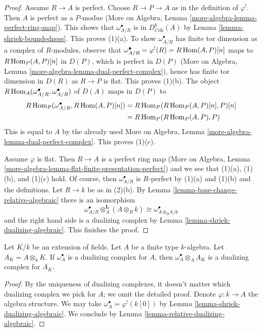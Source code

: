 \begin{proof}
Assume $R \to A$ is perfect. Choose $R \to P \to A$ as in the definition
of $\varphi^!$. Then $A$ is perfect as a $P$-modue
(More on Algebra, Lemma \ref{more-algebra-lemma-perfect-ring-map}).
This shows that $\omega_{A/R}^\bullet$ is in $D^b_{\textit{Coh}}(A)$
by Lemma \ref{lemma-shriek-boundedness}. This proves (1)(a).
To show $\omega_{A/R}^\bullet$ has finite tor dimension
as a complex of $R$-modules, observe that
$\omega_{A/R}^\bullet = \varphi^!(R) = R\mathop{\mathrm{Hom}}\nolimits(A, P)[n]$
maps to $R\mathop{\mathrm{Hom}}\nolimits_P(A, P)[n]$ in $D(P)$, which is perfect in $D(P)$
(More on Algebra, Lemma \ref{more-algebra-lemma-dual-perfect-complex}),
hence has finite tor dimension in $D(R)$
as $R \to P$ is flat. This proves (1)(b). The object
$R\mathop{\mathrm{Hom}}\nolimits_A(\omega_{A/R}^\bullet, \omega_{A/R}^\bullet)$
of $D(A)$ maps in $D(P)$ to
\begin{align*}
R\mathop{\mathrm{Hom}}\nolimits_P(\omega_{A/R}^\bullet, R\mathop{\mathrm{Hom}}\nolimits(A, P)[n])
& =
R\mathop{\mathrm{Hom}}\nolimits_P(R\mathop{\mathrm{Hom}}\nolimits_P(A, P)[n], P)[n] \\
& =
R\mathop{\mathrm{Hom}}\nolimits_P(R\mathop{\mathrm{Hom}}\nolimits_P(A, P), P)
\end{align*}
This is equal to $A$ by the already used
More on Algebra, Lemma \ref{more-algebra-lemma-dual-perfect-complex}.
This proves (1)(c).

\medskip\noindent
Assume $\varphi$ is flat. Then $R \to A$ is a perfect ring map
(More on Algebra, Lemma
\ref{more-algebra-lemma-flat-finite-presentation-perfect})
and we see that (1)(a), (1)(b), and (1)(c) hold.
Of course, then $\omega_{A/R}^\bullet$ is $R$-perfect by
(1)(a) and (1)(b) and the definitions.
Let $R \to k$ be as in (2)(b).
By Lemma \ref{lemma-base-change-relative-algebraic}
there is an isomorphism
$$
\omega_{A/R}^\bullet \otimes_A^\mathbf{L} (A \otimes_R k) \cong
\omega^\bullet_{A \otimes_R k/k}
$$
and the right hand side is a dualizing complex by
Lemma \ref{lemma-shriek-dualizing-algebraic}. This finishes the proof.
\end{proof}

\begin{lemma}
\label{lemma-base-change-dualizing-over-field}
Let $K/k$ be an extension of fields. Let $A$ be a finite type
$k$-algebra. Let $A_K = A \otimes_k K$. If
$\omega_A^\bullet$ is a dualizing complex for $A$, then
$\omega_A^\bullet \otimes_A A_K$ is a dualizing complex for $A_K$.
\end{lemma}

\begin{proof}
By the uniqueness of dualizing complexes, it doesn't matter which
dualizing complex we pick for $A$; we omit the detailed proof.
Denote $\varphi : k \to A$ the algebra structure.
We may take $\omega_A^\bullet = \varphi^!(k[0])$ by
Lemma \ref{lemma-shriek-dualizing-algebraic}.
We conclude by
Lemma \ref{lemma-relative-dualizing-algebraic}.
\end{proof}

